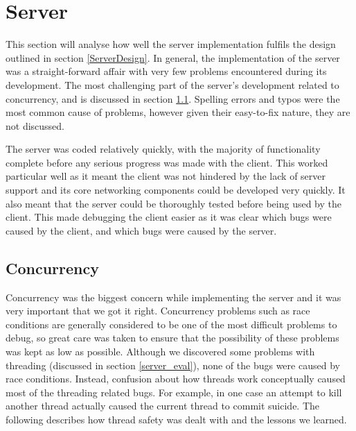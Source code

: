 \section{Server}

This section will analyse how well the server implementation fulfils the design outlined in section \ref{ServerDesign}. In general, the implementation of the server was a straight-forward affair with very few problems encountered during its development. The most challenging part of the server's development related to concurrency, and is discussed in section \ref{concur}. Spelling errors and typos were the most common cause of problems, however given their easy-to-fix nature, they are not discussed.

The server was coded relatively quickly, with the majority of functionality complete before any serious progress was made with the client. This worked particular well as it meant the client was not hindered by the lack of server support and its core networking components could be developed very quickly. It also meant that the server could be thoroughly tested before being used by the client. This made debugging the client easier as it was clear which bugs were caused by the client, and which bugs were caused by the server.

\subsection{Concurrency}
\label{concur}
Concurrency was the biggest concern while implementing the server and it was very important that we got it right. Concurrency problems such as race conditions are generally considered to be one of the most difficult problems to debug, so great care was taken to ensure that the possibility of these problems was kept as low as possible. Although we discovered some problems with threading (discussed in section \ref{server_eval}), none of the bugs were caused by race conditions. Instead, confusion about how threads work conceptually caused most of the threading related bugs. For example, in one case an attempt to kill another thread actually caused the current thread to commit suicide. The following describes how thread safety was dealt with and the lessons we learned.


